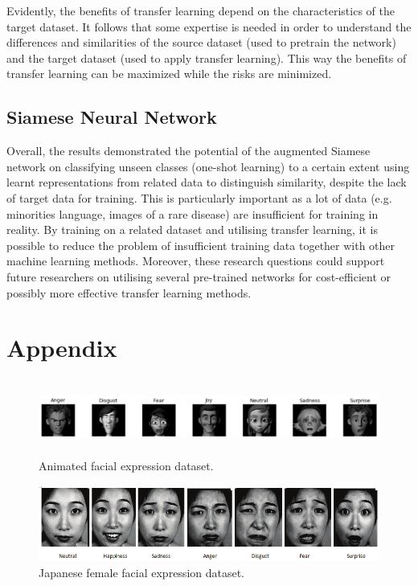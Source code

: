 \documentclass{article}
\begin{document}
Evidently, the benefits of transfer learning depend on the characteristics of the target dataset. It follows that some expertise is needed in order to understand the differences and similarities of the source dataset (used to pretrain the network) and the target dataset (used to apply transfer learning). This way the benefits of transfer learning can be maximized while the risks are minimized.

\subsection{Siamese Neural Network}

Overall, the results demonstrated the potential of the augmented Siamese network on classifying unseen classes (one-shot learning) to a certain extent using learnt representations from related data to distinguish similarity, despite the lack of target data for training. This is particularly important as a lot of data (e.g. minorities language, images of a rare disease) are insufficient for training in reality. By training on a related dataset and utilising transfer learning, it is possible to reduce the problem of insufficient training data together with other machine learning methods. Moreover, these research questions could support future researchers on utilising several pre-trained networks for cost-efficient or possibly more effective transfer learning methods.




\newpage

\appendix

\renewcommand\thefigure{\thesection.\arabic{figure}}    

\section{Appendix}

\setcounter{figure}{0}    

\begin{figure}[H]
    \begin{center}  
      \includegraphics[width=\textwidth,height=2.5cm]{animatedface.png}
      \caption{Animated facial expression dataset.}
      \label{appendix:face-ds}
    \end{center}
\end{figure}

\begin{figure}[H]
    \begin{center}
      \includegraphics[width=\textwidth,height=2.5cm]{jpwomen.jpg}
      \caption{Japanese female facial expression dataset.}
      \label{appendix:jap-ds}
    \end{center}
\end{figure}

\end{document}
